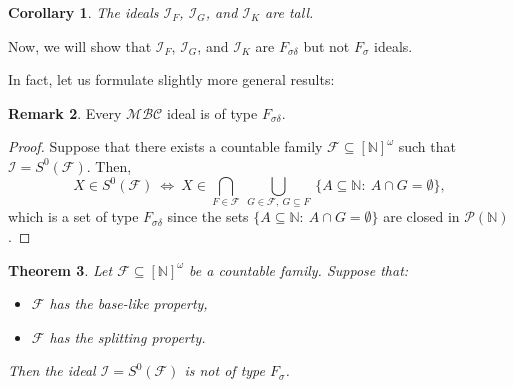 \documentclass{amsart}
\newtheorem{thm}{Theorem}[section]
\newtheorem{cor}[thm]{Corollary}
\theoremstyle{definition}
\newtheorem{remark}[thm]{Remark}
\newcommand{\N}{{\mathbb N}}
\newcommand{\I}{\mathcal I}
\newcommand{\InfSubs}{[\N]^{\omega}}
\newcommand{\MB}{S^0}
\newcommand{\MBC}{\mathcal{MBC}}
\begin{document}
\begin{cor} \label{tall}
The ideals $\I_F$, $\I_G$, and $\I_K$ are tall.
\end{cor}


Now, we will show that $\I_F$, $\I_G$, and $\I_K$ are $F_{\sigma\delta}$ but not $F_{\sigma}$ ideals.

In fact, let us formulate slightly more general results:

\begin{remark}
Every $\MBC$ ideal is of type $F_{\sigma\delta}$.
\end{remark}

\begin{proof}
Suppose that there exists a countable family $\mathcal{F}\subseteq \InfSubs$ such that $\I = \MB(\mathcal{F})$. Then,
$$X\in \MB(\mathcal{F})\ \Longleftrightarrow\ X\in \bigcap_{F\in\mathcal{F}}\ \bigcup_{G\in\mathcal{F},\ G\subseteq F}\ \{A\subseteq\N :\ A\cap G=\emptyset\},$$
which is a set of type $F_{\sigma\delta}$ since the sets $\{A\subseteq\N :\ A\cap G=\emptyset\}$ are closed in $\mathcal{P}(\N)$.
\end{proof}

\begin{thm} \label{thmFsigma}
Let $\mathcal{F}\subseteq \InfSubs$ be a countable family. Suppose that: 
\begin{itemize}
	\item[$(i)$] $\mathcal{F}$ has the base-like property,
	\item[$(ii)$] $\mathcal{F}$ has the splitting property.
\end{itemize} 
Then the ideal $\I=\MB(\mathcal{F})$ is not of type $F_{\sigma}$.
\end{thm}
\end{document}
